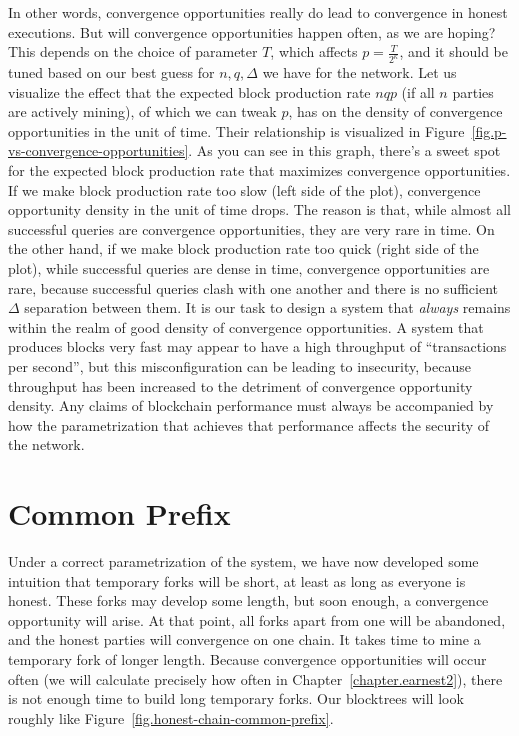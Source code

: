In other words, convergence opportunities really do lead to convergence in honest executions.
But will convergence opportunities happen often, as we are hoping?
This depends on the choice of parameter $T$,
which affects $p = \frac{T}{2^\kappa}$, and it should be tuned based on our best guess for
$n, q, \Delta$ we have
for the network. Let us visualize the effect that the expected block production rate $nqp$
(if all $n$ parties are actively mining), of which we can tweak $p$, has on the density of
convergence opportunities in the unit of time. Their relationship is visualized in
Figure~\ref{fig.p-vs-convergence-opportunities}. As you can see in this graph, there's a
sweet spot for the expected block production rate that maximizes convergence opportunities.
If we make block production rate too slow (left side of the plot), convergence opportunity
density in the unit of time drops. The reason is that, while almost all successful queries
are convergence opportunities, they are very rare in time. On the other hand, if we make
block production rate too quick (right side of the plot), while successful queries are dense
in time, convergence opportunities are rare, because successful queries clash with one another
and there is no sufficient $\Delta$ separation between them. It is our task to design a system
that \emph{always} remains within the realm of good density of convergence opportunities.
A system that produces blocks
very fast may appear to have a high throughput of ``transactions per second'', but this
misconfiguration can be leading to insecurity, because throughput has been increased to
the detriment of convergence opportunity density. Any claims of blockchain performance
must always be accompanied by how the parametrization that achieves that performance affects
the security of the network.

\section{Common Prefix}
Under a correct parametrization of the system, we have now developed some intuition that
temporary forks will be short, at least as long as everyone is honest. These forks may
develop some length, but soon enough, a convergence opportunity will arise. At that point,
all forks apart from one will be abandoned, and the honest parties will convergence on
one chain. It takes time to mine a temporary fork of longer length.
Because convergence opportunities will occur often (we will
calculate precisely how often in Chapter~\ref{chapter.earnest2}),
there is not enough time to build long temporary forks. Our blocktrees will look roughly
like Figure~\ref{fig.honest-chain-common-prefix}.

